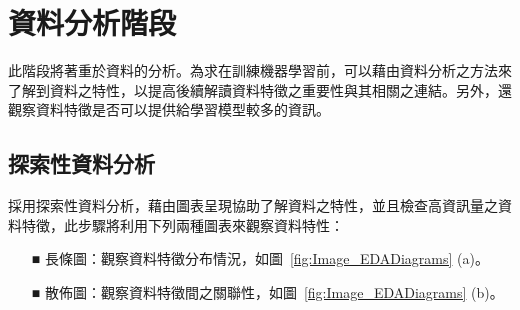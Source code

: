 
\section{資料分析階段}

此階段將著重於資料的分析。為求在訓練機器學習前，可以藉由資料分析之方法來了解到資料之特性，以提高後續解讀資料特徵之重要性與其相關之連結。另外，還觀察資料特徵是否可以提供給學習模型較多的資訊。

\subsection{探索性資料分析}
採用探索性資料分析，藉由圖表呈現協助了解資料之特性，並且檢查高資訊量之資料特徵，此步驟將利用下列兩種圖表來觀察資料特性：

\begin{itemize}
  \item [■] 長條圖：觀察資料特徵分布情況，如圖~\ref{fig:Image_EDADiagrams} (a)。
  \item [■] 散佈圖：觀察資料特徵間之關聯性，如圖~\ref{fig:Image_EDADiagrams} (b)。
\end{itemize}

